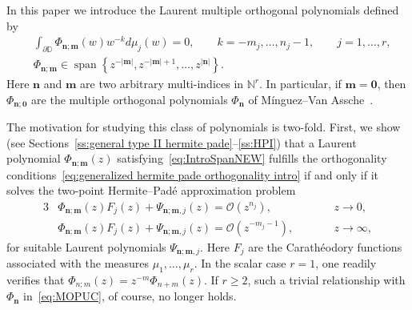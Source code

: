 \documentclass[reqno,centertags,11pt,draft]{amsart}
\newcommand{\N}{\mathbb{N}}
\newcommand{\T}{\mathbb{\partial\mathbb{D}}}
\newcommand{\abs}[1]{\left|#1\right|}
\newcommand{\set}[1]{\left\{#1\right\}}
\begin{document}
In this paper we introduce the Laurent multiple orthogonal polynomials defined by
\begin{align}
\label{eq:generalized hermite pade orthogonality intro}
    & \int_\T \Phi_{\bm{n};\bm{m}}(w)w^{-k}d\mu_j(w) = 0, \qquad k = -m_j,\dots,n_j-1, \qquad j = 1,\dots,r,
    \\
    \label{eq:IntroSpanNEW}
    & \Phi_{\bm{n};\bm{m}} \in \operatorname{span}\set{z^{-\abs{\bm{m}}},z^{-\abs{\bm{m}}+1},\dots,{z^{\abs{\bm{n}}}}}.
\end{align}
Here $\bm{n}$ and $\bm{m}$ are two arbitrary multi-indices in $\N^r$. In particular, if $\bm{m}=\bm{0}$, then $\Phi_{\bm{n};\bm{0}}$ are the 
multiple orthogonal polynomials $\Phi_{\bm{n}}$ of M\'{i}nguez--Van Assche~\cite{MOPUC1}.

The motivation for studying this class of polynomials is two-fold. First, we show (see Sections~\ref{ss:general type II hermite pade}--\ref{ss:HPI}) that a Laurent polynomial $\Phi_{\bm{n};\bm{m}}(z)$ satisfying~\eqref{eq:IntroSpanNEW} fulfills the orthogonality conditions~\eqref{eq:generalized hermite pade orthogonality intro} if and only if it solves the two-point Hermite--Pad\'{e} approximation problem 
\begin{alignat}{3}
    \label{eq:intro generalized two point hermite pade eq 1}
    & \Phi_{\bm{n};\bm{m}}(z)F_j(z) + \Psi_{\bm{n};\bm{m},j}(z) = \mathcal{O}(z^{n_j}),  \qquad &&z \rightarrow 0, \\
    \label{eq:intro generalized two point hermite pade eq 2}
    & \Phi_{\bm{n};\bm{m}}(z)F_j(z) + \Psi_{\bm{n};\bm{m},j}(z) = \mathcal{O}(z^{-m_j-1}), \qquad &&z \rightarrow \infty,
\end{alignat}
for suitable Laurent polynomials $\Psi_{\bm{n};\bm{m},j}$. Here $F_j$ are the Carath\'{e}odory functions associated with the measures $\mu_1,\ldots,\mu_r$.
In the scalar case $r=1$, one readily verifies that $\Phi_{n;m}(z) = z^{-m} \Phi_{n+m}(z)$.
If $r\ge 2$, such a trivial relationship with $\Phi_{\bm{n}}$ in~\eqref{eq:MOPUC}, of course, no longer holds. 
\end{document}
